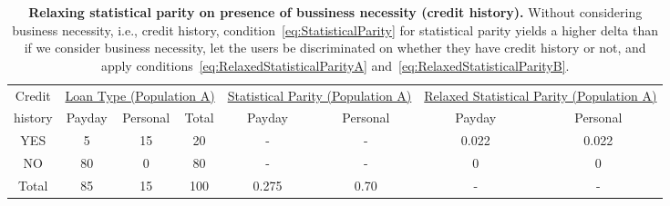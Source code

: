 \begin{table*}[t]
{ \small
  \center
  \renewcommand{\arraystretch}{1.5}
  \begin{tabular}{ c | c c c | c c | c c}
    Credit
    & \multicolumn{3}{|c|}{\underline{Loan Type (Population A)}}
    & \multicolumn{2}{|c}{\underline{Statistical Parity (Population A) }}
    & \multicolumn{2}{|c}{\underline{Relaxed Statistical Parity (Population A) }} \\
    history & Payday & Personal & Total & Payday & Personal & Payday & Personal \\
    \hline
    YES & 5  & 15 & 20 & - & - &  0.022 & 0.022 \\
    NO  & 80 & 0  & 80 & - & - &  0    & 0 \\
    \hline
    Total & 85 & 15 & 100 & 0.275 & 0.70 & - & - \\
  \end{tabular}
  \caption{{\bf Relaxing statistical parity on presence of bussiness necessity (credit history).}
    Without considering business necessity, i.e., credit history,
    condition~\ref{eq:StatisticalParity} for statistical parity yields a higher delta than if we
    consider business necessity, let the users be discriminated on whether they have credit
    history or not, and apply conditions~\ref{eq:RelaxedStatisticalParityA}
    and~\ref{eq:RelaxedStatisticalParityB}.
  }
  \label{tab:BusinessNessecityA}
}
\end{table*}
